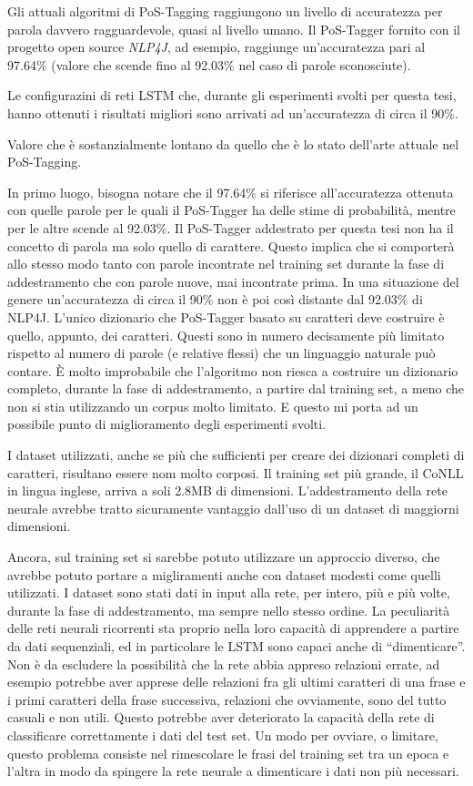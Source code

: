 Gli attuali algoritmi di PoS-Tagging raggiungono un livello di accuratezza per
parola davvero ragguardevole, quasi al livello umano. Il PoS-Tagger fornito con il
progetto open source \emph{NLP4J}, ad esempio, raggiunge un'accuratezza pari al
97.64\% (valore che scende fino al 92.03\% nel caso di parole sconosciute).

Le configurazini di reti LSTM che, durante gli esperimenti svolti per questa
tesi, hanno ottenuti i risultati migliori sono arrivati ad un'accuratezza di circa
il 90\%.

Valore che \`e sostanzialmente lontano da quello che \`e lo stato dell'arte attuale
nel PoS-Tagging.

In primo luogo, bisogna notare che il 97.64\% si riferisce all'accuratezza
ottenuta con quelle parole per le quali il PoS-Tagger ha delle stime di
probabilit\`a, mentre per le altre scende al 92.03\%. Il PoS-Tagger addestrato
per questa tesi non ha il concetto di parola ma solo quello di carattere. Questo
implica che si comporter\`a allo stesso modo tanto con parole incontrate nel
training set durante la fase di addestramento che con parole nuove, mai incontrate
prima. In una situazione del genere un'accuratezza di circa il 90\% non \`e poi
cos\`i distante dal 92.03\% di NLP4J. L'unico dizionario che PoS-Tagger basato su
caratteri deve costruire \`e quello, appunto, dei caratteri. Questi sono in numero
decisamente pi\`u limitato rispetto al numero di parole (e relative flessi) che
un linguaggio naturale pu\`o contare. \`E molto improbabile che l'algoritmo non
riesca a costruire un dizionario completo, durante la fase di addestramento, a
partire dal training set, a meno che non si stia utilizzando un corpus molto
limitato. E questo mi porta ad un possibile punto di miglioramento degli
esperimenti svolti.

I dataset utilizzati, anche se pi\`u che sufficienti per creare dei dizionari
completi di caratteri, risultano essere nom molto corposi. Il training set pi\`u
grande, il CoNLL in lingua inglese, arriva a soli 2.8MB di dimensioni. L'addestramento
della rete neurale avrebbe tratto sicuramente vantaggio dall'uso di un dataset di
maggiorni dimensioni.

Ancora, sul training set si sarebbe potuto utilizzare un approccio diverso, che
avrebbe potuto portare a migliramenti anche con dataset modesti come quelli utilizzati.
I dataset sono stati dati in input alla rete, per intero, pi\`u e pi\`u volte,
durante la fase di addestramento, ma sempre nello stesso ordine. La peculiarit\`a
delle reti neurali ricorrenti sta proprio nella loro capacit\`a di apprendere a
partire da dati sequenziali, ed in particolare le LSTM sono capaci anche di
``dimenticare''. Non \`e da escludere la possibilit\`a che la rete abbia appreso
relazioni errate, ad esempio potrebbe aver apprese delle relazioni fra gli ultimi
caratteri di una frase e i primi caratteri della frase successiva, relazioni che
ovviamente, sono del tutto casuali e non utili. Questo potrebbe aver deteriorato
la capacit\`a della rete di classificare correttamente i dati del test set. Un
modo per ovviare, o limitare, questo problema consiste nel rimescolare le frasi
del training set tra un epoca e l'altra in modo da spingere la rete neurale a
dimenticare i dati non pi\`u necessari.

